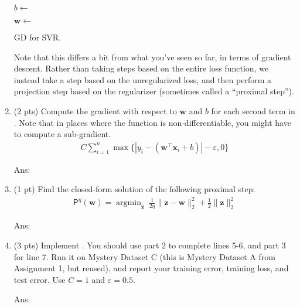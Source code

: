 \documentclass[10pt,letter,notitlepage]{article}
\newcommand{\argmin}{\mathop{\mathrm{argmin}}}
\newcommand{\wv}{\mathbf{w}}
\newcommand{\xv}{\mathbf{x}}
\newcommand{\zv}{\mathbf{z}}
\newcommand{\ans}[1]{{\color{orange}\textsf{Ans}: #1}}
\newcounter{exercise}
\begin{document}
\begin{exercise}
\begin{enumerate}
\begin{algorithm}[H]
{{{				$b \gets $
			}	
			
			$\wv \gets $ 
		}
	}
	\caption{GD for SVR.}
	\label{alg:CSVM}
\end{algorithm}

    Note that this differs a bit from what you've seen so far, in terms of gradient descent. Rather than taking steps based on the entire loss function, we instead take a step based on the unregularized loss, and then perform a projection step based on the regularizer (sometimes called a ``proximal step'').

\item (2 pts) Compute the gradient with respect to $\wv$ and $b$ for each second term in .
Note that in places where the function is non-differentiable, you might have to compute a sub-gradient.
\begin{align}
C\sum_{i=1}^n \max\{ | y_i -  (\wv^\top \xv_i + b)| -\varepsilon , 0 \}
\end{align}
	
	
\ans{} 

	
\item (1 pt) Find the closed-form solution of the following proximal step:
	\begin{align}
	\mathsf{P}^\eta(\wv) = \argmin_{\zv} ~ \frac{1}{2\eta} \|\zv - \wv\|_2^2 + \frac{1}{2} \|\zv\|_2^2
	\end{align}
	
	
\ans{} 

	
\item (3 pts) Implement . You should use part 2 to complete lines 5-6, and part 3 for line 7. 
Run it on Mystery Dataset C (this is Mystery Dataset A from Assignment 1, but reused), and report your training error, training loss, and test error. Use $C=1$ and $\varepsilon = 0.5$.

\ans{} 

\end{enumerate}
\end{exercise}
\end{document}
